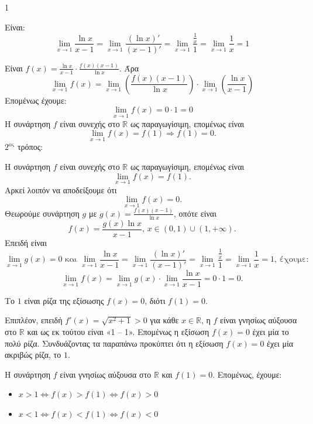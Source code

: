 \begin{ylh}{1}
    \item [Ύλη από εικόνα]
\end{ylh}
\begin{alist}
    \item [α)]
    \begin{rlist}
        \item Είναι:
        \[ \lim_{x \to 1} \frac{\ln x}{x-1} = \lim_{x \to 1} \frac{(\ln x)'}{(x-1)'} = \lim_{x \to 1} \frac{\frac{1}{x}}{1} = \lim_{x \to 1} \frac{1}{x} = 1 \]
        \item Είναι $f(x) = \frac{\ln x}{x-1} \cdot \frac{f(x)(x-1)}{\ln x}$. Άρα
        \[ \lim_{x \to 1} f(x) = \lim_{x \to 1} \left(\frac{f(x)(x-1)}{\ln x}\right) \cdot \lim_{x \to 1} \left(\frac{\ln x}{x-1}\right) \]
        Επομένως έχουμε:
        \[ \lim_{x \to 1} f(x) = 0 \cdot 1 = 0 \]
        Η συνάρτηση $f$ είναι συνεχής στο $\mathbb{R}$ ως παραγωγίσιμη, επομένως είναι
        \[ \lim_{x \to 1} f(x) = f(1) \Rightarrow f(1) = 0. \]
        $2^{\text{ος}}$ τρόπος:

        Η συνάρτηση $f$ είναι συνεχής στο $\mathbb{R}$ ως παραγωγίσιμη, επομένως είναι
        \[ \lim_{x \to 1} f(x) = f(1). \]
        Αρκεί λοιπόν να αποδείξουμε ότι
        \[ \lim_{x \to 1} f(x) = 0. \]
        Θεωρούμε συνάρτηση $g$ με $g(x) = \frac{f(x)(x-1)}{\ln x}$, οπότε είναι
        \[ f(x) = \frac{g(x) \ln x}{x-1} \text{, } x \in (0,1) \cup (1,+\infty). \]
        Επειδή είναι
        \[ \lim_{x \to 1} g(x) = 0 \text{ και } \lim_{x \to 1} \frac{\ln x}{x-1} = \lim_{x \to 1} \frac{(\ln x)'}{(x-1)'} = \lim_{x \to 1} \frac{\frac{1}{x}}{1} = \lim_{x \to 1} \frac{1}{x} = 1 \text{, έχουμε:} \]
        \[ \lim_{x \to 1} f(x) = \lim_{x \to 1} g(x) \cdot \lim_{x \to 1} \frac{\ln x}{x-1} = 0 \cdot 1 = 0. \]
    \end{rlist}
    \item [β)] Το $1$ είναι ρίζα της εξίσωσης $f(x) = 0$, διότι $f(1) = 0$.

    Επιπλέον, επειδή $f'(x) = \sqrt{x^2+1} > 0$ για κάθε $x \in \mathbb{R}$, η $f$ είναι γνησίως αύξουσα στο $\mathbb{R}$ και ως εκ τούτου είναι «1 – 1». Επομένως η εξίσωση $f(x) = 0$ έχει μία το πολύ ρίζα. Συνδυάζοντας τα παραπάνω προκύπτει ότι η εξίσωση $f(x) = 0$ έχει μία ακριβώς ρίζα, το $1$.

    \item [γ)] Η συνάρτηση $f$ είναι γνησίως αύξουσα στο $\mathbb{R}$ και $f(1) = 0$. Επομένως, έχουμε:
    \begin{itemize}
        \item $x > 1 \Leftrightarrow f(x) > f(1) \Leftrightarrow f(x) > 0$
        \item $x < 1 \Leftrightarrow f(x) < f(1) \Leftrightarrow f(x) < 0$
    \end{itemize}


\end{alist}
